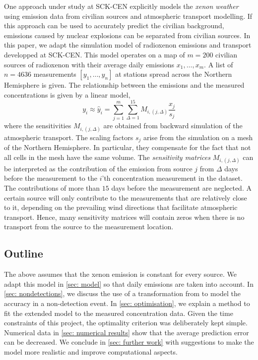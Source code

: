 \documentclass{article}
\begin{document}
One approach under study at SCK-CEN explicitly models the \emph{xenon weather} using emission data from civilian sources and atmospheric transport modelling. If this approach can be used to accurately predict the civilian background, emissions caused by nuclear explosions can be separated from civilian sources. In this paper, we adapt the simulation model of radioxenon emissions and transport developped at SCK-CEN. This model operates on a map of $m = 200$ civilian sources of radioxenon with their average daily emissions $x_1,\dots,x_m$. A list of $n = 4636$ measurements $[y_1,\dots,y_n]$ at stations spread across the Northern Hemisphere is given. The relationship between the emissions and the measured concentrations is given by a linear model,  
\begin{equation}
    \label{eq: initial model}
y_i \approx
\hat{y}_i = \sum_{j=1}^m \sum_{\Delta = 1}^{15}  M_{i,(j,\Delta)} \frac{x_{j}}{s_j}
\end{equation}
where the sensitivities $M_{i,(j, \Delta)}$ are obtained from backward simulation of the atmospheric transport. The scaling factors $s_j$ arise from the simulation on a mesh of the Northern Hemisphere. In particular, they compensate for the fact that not all cells in the mesh have the same volume. 
The \emph{sensitivity matrices} $M_{i,(j,\Delta)}$ can be interpreted as the contribution of the emission from source $j$ from $\Delta$ days before the measurement to the $i$'th concentration measurement in the dataset. The contributions of more than $15$ days before the measurement are neglected. A certain source will only contribute to the measurements that are relatively close to it, depending on the prevailing wind directions that facilitate atmospheric transport. Hence, many sensitivity matrices will contain zeros when there is no transport from the source to the measurement location.

\subsection{Outline}
The above assumes that the xenon emission is constant for every source. We adapt this model in \cref{sec: model} so that daily emissions are taken into account. In \cref{sec: nondetections}, we discuss the use of a transformation from \cite{deMeutter2022uncertainty} to model the accuracy in a non-detection event.
In \cref{sec: optimisation}, we explain a method to fit the extended model to the measured concentration data. Given the time constraints of this project, the optimality criterion was deliberately kept simple. Numerical data in \cref{sec: numerical results} show that the average prediction error can be decreased. We conclude in \cref{sec: further work} with suggestions to make the model more realistic and improve computational aspects.
\end{document}
